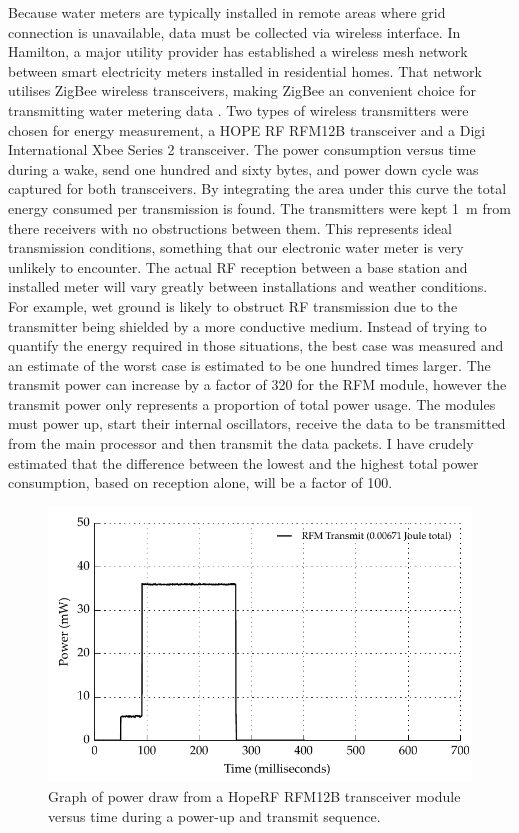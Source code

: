     Because water meters are typically installed in remote areas where grid connection is unavailable, data must be collected via wireless interface.
    In Hamilton, a major utility provider has established a wireless mesh network between smart electricity meters installed in residential homes.
    That network utilises ZigBee wireless transceivers, making ZigBee an convenient choice for transmitting water metering data \cite{MalcolmSouness-WELNetworks2012}.
    Two types of wireless transmitters were chosen for energy measurement, a HOPE RF RFM12B transceiver and a Digi International Xbee Series 2 transceiver.
    The power consumption versus time during a wake, send one hundred and sixty bytes, and power down cycle was captured for both transceivers.
    By integrating the area under this curve the total energy consumed per transmission is found.
    The transmitters were kept \SI{1}{\meter} from there receivers with no obstructions between them.
    This represents ideal transmission conditions, something that our electronic water meter is very unlikely to encounter.
    The actual RF reception between a base station and installed meter will vary greatly between installations and weather conditions.
    For example, wet ground is likely to obstruct RF transmission due to the transmitter being shielded by a more conductive medium.
    Instead of trying to quantify the energy required in those situations, the best case was measured and an estimate of the worst case is estimated to be one hundred times larger.
    The transmit power can increase by a factor of 320 for the RFM module, however the transmit power only represents a proportion of total power usage.
    The modules must power up, start their internal oscillators, receive the data to be transmitted from the main processor and then transmit the data packets.
    I have crudely estimated that the difference between the lowest and the highest total power consumption, based on reception alone, will be a factor of 100.

    \begin{figure}
      \centering
      \includegraphics{content/pt1/03-EnergyRequirements/graphics/Graph_RFMPower.pdf}
      \caption{\label{fig:Energy-consumed-RFM12B}Graph of power draw from a HopeRF RFM12B transceiver module versus time during a power-up and transmit sequence.}
    \end{figure}

